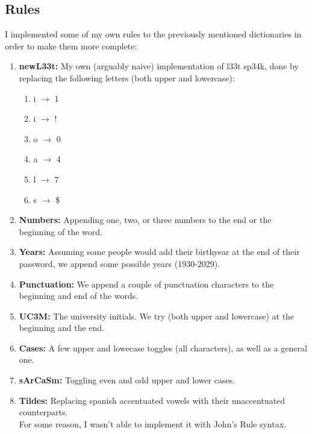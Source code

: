 \subsection{Rules}
I implemented some of my own rules to the previously mentioned dictionaries in order to make them more complete:
\begin{enumerate}
    \item \textbf{newL33t:} My own (arguably naive) implementation of l33t sp34k, done by replacing the following letters (both upper and lowercase):
    \begin{enumerate}
        \item i $\rightarrow$ 1
        \item i $\rightarrow$ !
        \item o $\rightarrow$ 0
        \item a $\rightarrow$ 4
        \item l $\rightarrow$ 7
        \item s $\rightarrow$ \$
    \end{enumerate}
    \item \textbf{Numbers:} Appending one, two, or three numbers to the end or the beginning of the word.
    \item \textbf{Years:} Assuming some people would add their birthyear at the end of their password, we append some possible years (1930-2029).
    \item \textbf{Punctuation:} We append a couple of punctuation characters to the beginning and end of the words.
    \item \textbf{UC3M:} The university initials. We try (both upper and lowercase) at the beginning and the end.
    \item \textbf{Cases:} A few upper and lowecase toggles (all characters), as well as a general one.
    \item \textbf{sArCaSm:} Toggling even and odd upper and lower cases.
    \item \textbf{Tildes:} Replacing spanish accentuated vowels with their unaccentuated counterparts.\\
    For some reason, I wasn't able to implement it with John's Rule syntax.
\end{enumerate}
